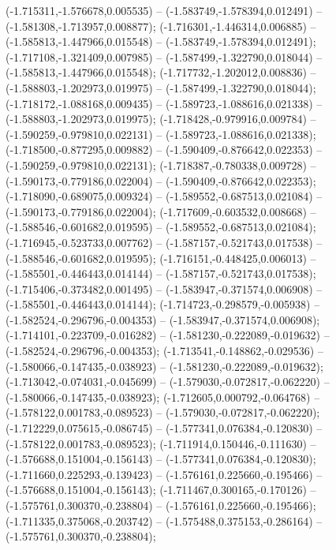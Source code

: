  (-1.715311,-1.576678,0.005535) -- (-1.583749,-1.578394,0.012491) -- (-1.581308,-1.713957,0.008877);
 (-1.716301,-1.446314,0.006885) -- (-1.585813,-1.447966,0.015548) -- (-1.583749,-1.578394,0.012491);
 (-1.717108,-1.321409,0.007985) -- (-1.587499,-1.322790,0.018044) -- (-1.585813,-1.447966,0.015548);
 (-1.717732,-1.202012,0.008836) -- (-1.588803,-1.202973,0.019975) -- (-1.587499,-1.322790,0.018044);
 (-1.718172,-1.088168,0.009435) -- (-1.589723,-1.088616,0.021338) -- (-1.588803,-1.202973,0.019975);
 (-1.718428,-0.979916,0.009784) -- (-1.590259,-0.979810,0.022131) -- (-1.589723,-1.088616,0.021338);
 (-1.718500,-0.877295,0.009882) -- (-1.590409,-0.876642,0.022353) -- (-1.590259,-0.979810,0.022131);
 (-1.718387,-0.780338,0.009728) -- (-1.590173,-0.779186,0.022004) -- (-1.590409,-0.876642,0.022353);
 (-1.718090,-0.689075,0.009324) -- (-1.589552,-0.687513,0.021084) -- (-1.590173,-0.779186,0.022004);
 (-1.717609,-0.603532,0.008668) -- (-1.588546,-0.601682,0.019595) -- (-1.589552,-0.687513,0.021084);
 (-1.716945,-0.523733,0.007762) -- (-1.587157,-0.521743,0.017538) -- (-1.588546,-0.601682,0.019595);
 (-1.716151,-0.448425,0.006013) -- (-1.585501,-0.446443,0.014144) -- (-1.587157,-0.521743,0.017538);
 (-1.715406,-0.373482,0.001495) -- (-1.583947,-0.371574,0.006908) -- (-1.585501,-0.446443,0.014144);
 (-1.714723,-0.298579,-0.005938) -- (-1.582524,-0.296796,-0.004353) -- (-1.583947,-0.371574,0.006908);
 (-1.714101,-0.223709,-0.016282) -- (-1.581230,-0.222089,-0.019632) -- (-1.582524,-0.296796,-0.004353);
 (-1.713541,-0.148862,-0.029536) -- (-1.580066,-0.147435,-0.038923) -- (-1.581230,-0.222089,-0.019632);
 (-1.713042,-0.074031,-0.045699) -- (-1.579030,-0.072817,-0.062220) -- (-1.580066,-0.147435,-0.038923);
 (-1.712605,0.000792,-0.064768) -- (-1.578122,0.001783,-0.089523) -- (-1.579030,-0.072817,-0.062220);
 (-1.712229,0.075615,-0.086745) -- (-1.577341,0.076384,-0.120830) -- (-1.578122,0.001783,-0.089523);
 (-1.711914,0.150446,-0.111630) -- (-1.576688,0.151004,-0.156143) -- (-1.577341,0.076384,-0.120830);
 (-1.711660,0.225293,-0.139423) -- (-1.576161,0.225660,-0.195466) -- (-1.576688,0.151004,-0.156143);
 (-1.711467,0.300165,-0.170126) -- (-1.575761,0.300370,-0.238804) -- (-1.576161,0.225660,-0.195466);
 (-1.711335,0.375068,-0.203742) -- (-1.575488,0.375153,-0.286164) -- (-1.575761,0.300370,-0.238804);
